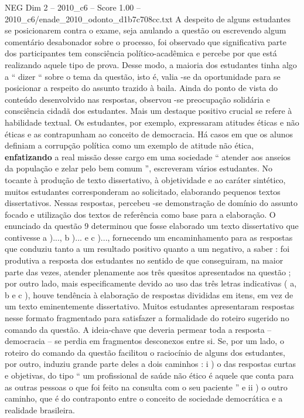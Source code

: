 \begin{textsample}{NEG Dim 2 – 2010\_c6 – Score 1.00 – 2010\_c6/enade\_2010\_odonto\_d1b7c708cc.txt}
A despeito de alguns estudantes se posicionarem contra o exame, seja anulando a questão ou escrevendo algum comentário desabonador sobre o processo, foi observado que significativa parte dos participantes tem consciência político-acadêmica e percebe por que está realizando aquele tipo de prova.
Desse modo, a maioria dos estudantes tinha algo a “ dizer “ sobre o tema da questão, isto é, valia -se da oportunidade para se posicionar a respeito do assunto trazido à baila.
Ainda do ponto de vista do conteúdo desenvolvido nas respostas, observou -se preocupação solidária e consciência cidadã dos estudantes.
Mais um destaque positivo crucial se refere à habilidade textual.
Os estudantes, por exemplo, expressaram atitudes éticas e não éticas e as contrapunham ao conceito de democracia.
Há casos em que os alunos definiam a corrupção política como um exemplo de atitude não ética, \textbf{enfatizando} a real missão desse cargo em uma sociedade “ atender aos anseios da população e zelar pelo bem comum ”, escreveram vários estudantes.
No tocante à produção de texto dissertativo, à objetividade e ao caráter sintético, muitos estudantes corresponderam ao solicitado, elaborando pequenos textos dissertativos.
Nessas respostas, percebeu -se demonstração de domínio do assunto focado e utilização dos textos de referência como base para a elaboração.
O enunciado da questão 9 determinou que fosse elaborado um texto dissertativo que contivesse a )..., b )... e c )..., fornecendo um encaminhamento para as respostas que conduziu tanto a um resultado positivo quanto a um negativo, a saber : foi produtiva a resposta dos estudantes no sentido de que conseguiram, na maior parte das vezes, atender plenamente aos três quesitos apresentados na questão ; por outro lado, mais especificamente devido ao uso das três letras indicativas ( a, b e c ), houve tendência à elaboração de respostas divididas em itens, em vez de um texto eminentemente dissertativo.
Muitos estudantes apresentaram respostas nesse formato fragmentado para satisfazer a formalidade do roteiro sugerido no comando da questão.
A ideia-chave que deveria permear toda a resposta – democracia – se perdia em fragmentos desconexos entre si.
Se, por um lado, o roteiro do comando da questão facilitou o raciocínio de alguns dos estudantes, por outro, induziu grande parte deles a dois caminhos : i ) o das respostas curtas e objetivas, do tipo “ um profissional de saúde não ético é aquele que conta para as outras pessoas o que foi feito na consulta com o seu paciente ” e ii ) o outro caminho, que é do contraponto entre o conceito de sociedade democrática e a realidade brasileira.

\end{textsample}
